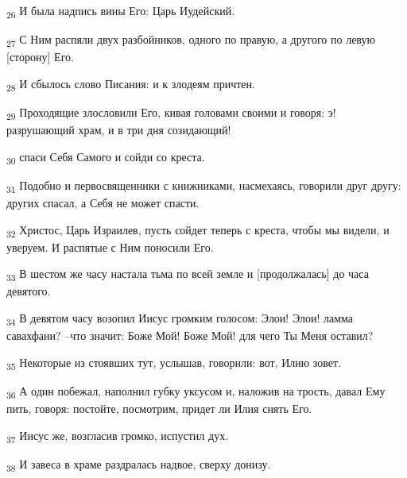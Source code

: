 \begin{tcolorbox}
\textsubscript{26} И была надпись вины Его: Царь Иудейский.
\end{tcolorbox}
\begin{tcolorbox}
\textsubscript{27} С Ним распяли двух разбойников, одного по правую, а другого по левую [сторону] Его.
\end{tcolorbox}
\begin{tcolorbox}
\textsubscript{28} И сбылось слово Писания: и к злодеям причтен.
\end{tcolorbox}
\begin{tcolorbox}
\textsubscript{29} Проходящие злословили Его, кивая головами своими и говоря: э! разрушающий храм, и в три дня созидающий!
\end{tcolorbox}
\begin{tcolorbox}
\textsubscript{30} спаси Себя Самого и сойди со креста.
\end{tcolorbox}
\begin{tcolorbox}
\textsubscript{31} Подобно и первосвященники с книжниками, насмехаясь, говорили друг другу: других спасал, а Себя не может спасти.
\end{tcolorbox}
\begin{tcolorbox}
\textsubscript{32} Христос, Царь Израилев, пусть сойдет теперь с креста, чтобы мы видели, и уверуем. И распятые с Ним поносили Его.
\end{tcolorbox}
\begin{tcolorbox}
\textsubscript{33} В шестом же часу настала тьма по всей земле и [продолжалась] до часа девятого.
\end{tcolorbox}
\begin{tcolorbox}
\textsubscript{34} В девятом часу возопил Иисус громким голосом: Элои! Элои! ламма савахфани? --что значит: Боже Мой! Боже Мой! для чего Ты Меня оставил?
\end{tcolorbox}
\begin{tcolorbox}
\textsubscript{35} Некоторые из стоявших тут, услышав, говорили: вот, Илию зовет.
\end{tcolorbox}
\begin{tcolorbox}
\textsubscript{36} А один побежал, наполнил губку уксусом и, наложив на трость, давал Ему пить, говоря: постойте, посмотрим, придет ли Илия снять Его.
\end{tcolorbox}
\begin{tcolorbox}
\textsubscript{37} Иисус же, возгласив громко, испустил дух.
\end{tcolorbox}
\begin{tcolorbox}
\textsubscript{38} И завеса в храме раздралась надвое, сверху донизу.
\end{tcolorbox}
